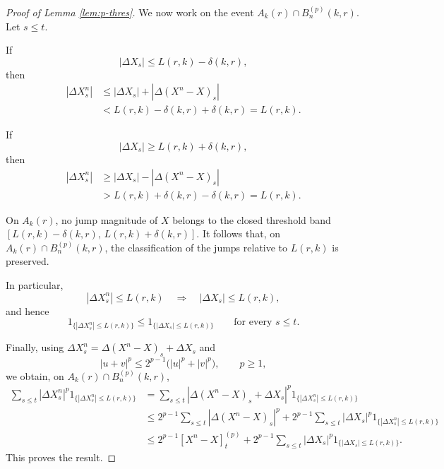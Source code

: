 \documentclass[a4paper,10pt]{article}
\begin{document}
\begin{proof}[Proof of Lemma \ref{lem:p-thres}]
We now work on the event
$
A_k(r)\cap B_n^{(p)}(k,r).
$
Let \(s\le t\).

If
\[
|\Delta X_s|
\le
L(r,k)-\delta(k,r),
\]
then
\[
\begin{aligned}
|\Delta X^n_s|
&\le
|\Delta X_s|
+
|\Delta(X^n-X)_s|
\\
&<
L(r,k)-\delta(k,r)+\delta(k,r)
=
L(r,k).
\end{aligned}
\]

If
\[
|\Delta X_s|
\ge
L(r,k)+\delta(k,r),
\]
then
\[
\begin{aligned}
|\Delta X^n_s|
&\ge
|\Delta X_s|
-
|\Delta(X^n-X)_s|
\\
&>
L(r,k)+\delta(k,r)-\delta(k,r)
=
L(r,k).
\end{aligned}
\]

On \(A_k(r)\), no jump magnitude of \(X\) belongs to the closed
threshold band
$
[L(r,k)-\delta(k,r),\,L(r,k)+\delta(k,r)].
$
It follows that, on \(A_k(r)\cap B_n^{(p)}(k,r)\), the classification
of the jumps relative to \(L(r,k)\) is preserved.

In particular,
\[
|\Delta X^n_s|\le L(r,k)
\quad\Longrightarrow\quad
|\Delta X_s|\le L(r,k),
\]
and hence
\[
1_{\{|\Delta X^n_s|\le L(r,k)\}}
\le
1_{\{|\Delta X_s|\le L(r,k)\}}
\qquad\text{for every }s\le t.
\]

Finally, using
$
\Delta X^n_s
=
\Delta(X^n-X)_s+\Delta X_s
$
and
\[
|u+v|^p
\le
2^{p-1}\bigl(|u|^p+|v|^p\bigr),
\qquad p\ge1,
\]
we obtain, on \(A_k(r)\cap B_n^{(p)}(k,r)\),
\begin{align*}
\sum_{s\le t}
|\Delta X^n_s|^p
1_{\{|\Delta X^n_s|\le L(r,k)\}}
&=
\sum_{s\le t}
|\Delta(X^n-X)_s+\Delta X_s|^p
1_{\{|\Delta X^n_s|\le L(r,k)\}}
\\
&\le
2^{p-1}
\sum_{s\le t}
|\Delta(X^n-X)_s|^p
+
2^{p-1}
\sum_{s\le t}
|\Delta X_s|^p
1_{\{|\Delta X^n_s|\le L(r,k)\}}
\\
&\le
2^{p-1}[X^n-X]^{(p)}_t
+
2^{p-1}
\sum_{s\le t}
|\Delta X_s|^p
1_{\{|\Delta X_s|\le L(r,k)\}}.
\end{align*}
This proves the result.
\end{proof}
\end{document}
